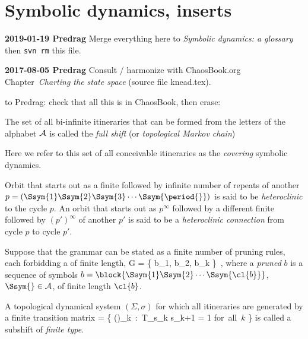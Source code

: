

\section{Symbolic dynamics, inserts}
\label{s-SymbDynDefs}

{\bf 2019-01-19 Predrag} Merge everything here to 
{\em Symbolic dynamics: a glossary} then \texttt{svn rm} this file.

{\bf 2017-08-05 Predrag}
Consult / harmonize with  ChaosBook.org Chapter~{\em Charting the state space} (source file knead.tex).



\bigskip

to Predrag: check that all this is in Chaos\-Book, then erase:

\bigskip


The set of all bi-infinite itineraries that can be formed from the
letters of the alphabet ${\cal A}$ is called the
{\em full shift} (or {\em topological Markov chain})

Here we refer to this set of all conceivable itineraries
as the {\em covering} symbolic dynamics.

Orbit that starts out as a finite {\brick} followed by infinite number of
repeats of another {\brick} $p = (\Ssym{1} \Ssym{2} \Ssym{3} \cdots
\Ssym{\period{}})$ is said to be {\em heteroclinic} to the cycle $p$. An
orbit that starts out as $p^{\infty}$ followed by a different finite
{\brick} followed by $(p')^{\infty}$ of another {\brick} $p'$ is said to be a
{\em heteroclinic connection} from cycle $p$ to cycle $p'$.



Suppose that
the grammar can be stated as a finite number of pruning rules, each
forbidding a {\brick} of finite length,
\beq
 {\cal G} = \left\{
        b_1, b_2, \cdots b_k
        \right\}
\,,
where a {\em pruned {\brick}} $b$ is a sequence of symbols
$b=\block{ \Ssym{1} \Ssym{2} \cdots \Ssym{\cl{b}}}$,
 $\Ssym{} \in {\cal A}$,
of finite length $\cl{b}$.


A {topological dynamical system} $(\Sigma,\sigma)$ for
which all {\admissible} itineraries are generated by a finite
transition matrix
\beq
\Sigma = \left\{ ()_{k\in \integers} \,:\, T_{s_k s_{k+1}} = 1
        \quad \mbox{for all $k$} \right\}
is called a subshift of {\em finite type}.


